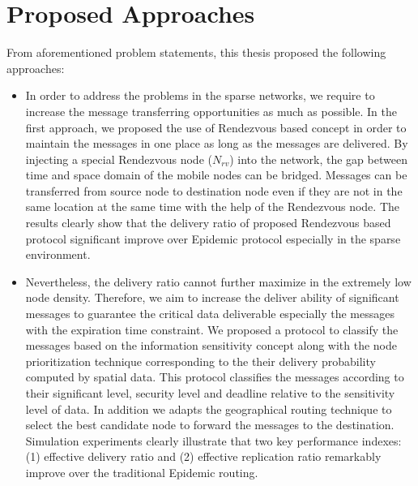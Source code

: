 \section{Proposed Approaches}
\label{intro:Proposed Approaches}
From aforementioned problem statements, this thesis proposed the following approaches:

\begin{itemize}
\item %
In order to address the problems in the sparse networks, we require to increase the message transferring opportunities as much as possible.
%
In the first approach, we proposed the use of Rendezvous based concept in order to maintain the messages in one place as long as the messages are delivered. 
%
By injecting a special Rendezvous node ($N_{rv}$) into the network, the gap between time and space domain of the mobile nodes can be bridged. 
%
Messages can be transferred from source node to destination node even if they are not in the same location at the same time with the help of the Rendezvous node.
% 
The results clearly show that the delivery ratio of proposed Rendezvous based protocol significant improve over Epidemic protocol especially in the sparse environment.

\item %
Nevertheless, the delivery ratio cannot further maximize in the extremely low node density.
%
Therefore, we aim to increase the deliver ability of significant messages to guarantee the critical data deliverable especially the messages with the expiration time constraint. 
%
We proposed a protocol to classify the messages based on the information sensitivity concept along with the node prioritization technique corresponding to the their delivery probability computed by spatial data. 
%
This protocol classifies the messages according to their significant level, security level and deadline relative to the sensitivity level of data.
% 
In addition we adapts the geographical routing technique to select the best candidate node to forward the messages to the destination. 
%
Simulation experiments clearly illustrate that two key performance indexes: (1) effective delivery ratio and (2) effective replication ratio remarkably improve over the traditional Epidemic routing. 
\end{itemize}

